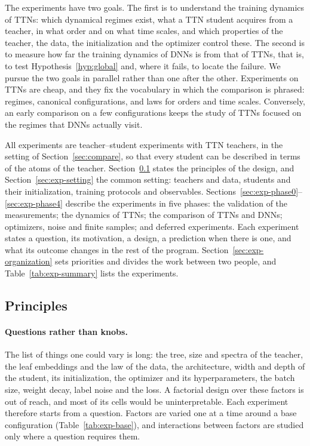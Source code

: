 \documentclass[11pt]{article}
\theoremstyle{definition}
\numberwithin{equation}{section}
\begin{document}
The experiments have two goals. The first is to understand the training dynamics of TTNs: which dynamical regimes exist, what a TTN student acquires from a teacher, in what order and on what time scales, and which properties of the teacher, the data, the initialization and the optimizer control these. The second is to measure how far the training dynamics of DNNs is from that of TTNs, that is, to test Hypothesis~\ref{hyp:global} and, where it fails, to locate the failure. We pursue the two goals in parallel rather than one after the other. Experiments on TTNs are cheap, and they fix the vocabulary in which the comparison is phrased: regimes, canonical configurations, and laws for orders and time scales. Conversely, an early comparison on a few configurations keeps the study of TTNs focused on the regimes that DNNs actually visit.

All experiments are teacher--student experiments with TTN teachers, in the setting of Section~\ref{sec:compare}, so that every student can be described in terms of the atoms of the teacher. Section~\ref{sec:exp-principles} states the principles of the design, and Section~\ref{sec:exp-setting} the common setting: teachers and data, students and their initialization, training protocols and observables. Sections~\ref{sec:exp-phase0}--\ref{sec:exp-phase4} describe the experiments in five phases: the validation of the measurements; the dynamics of TTNs; the comparison of TTNs and DNNs; optimizers, noise and finite samples; and deferred experiments. Each experiment states a question, its motivation, a design, a prediction when there is one, and what its outcome changes in the rest of the program. Section~\ref{sec:exp-organization} sets priorities and divides the work between two people, and Table~\ref{tab:exp-summary} lists the experiments.

\subsection{Principles}\label{sec:exp-principles}

\paragraph{Questions rather than knobs.}
The list of things one could vary is long: the tree, size and spectra of the teacher, the leaf embeddings and the law of the data, the architecture, width and depth of the student, its initialization, the optimizer and its hyperparameters, the batch size, weight decay, label noise and the loss. A factorial design over these factors is out of reach, and most of its cells would be uninterpretable. Each experiment therefore starts from a question. Factors are varied one at a time around a base configuration (Table~\ref{tab:exp-base}), and interactions between factors are studied only where a question requires them.
\end{document}
